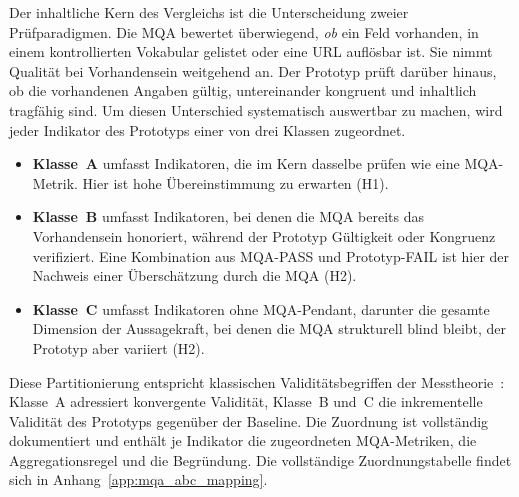 Der inhaltliche Kern des Vergleichs ist die Unterscheidung zweier Prüfparadigmen. Die MQA
bewertet überwiegend, \emph{ob} ein Feld vorhanden, in einem kontrollierten Vokabular
gelistet oder eine URL auflösbar ist. Sie nimmt Qualität bei Vorhandensein weitgehend an.
Der Prototyp prüft darüber hinaus, ob die vorhandenen Angaben gültig, untereinander
kongruent und inhaltlich tragfähig sind. Um diesen Unterschied systematisch auswertbar zu
machen, wird jeder Indikator des Prototyps einer von drei Klassen zugeordnet.

\begin{itemize}
    \item \textbf{Klasse~A} umfasst Indikatoren, die im Kern dasselbe prüfen wie eine
    MQA-Metrik. Hier ist hohe Übereinstimmung zu erwarten (H1).

    \item \textbf{Klasse~B} umfasst Indikatoren, bei denen die MQA bereits das Vorhandensein honoriert, während der Prototyp Gültigkeit oder Kongruenz verifiziert. Eine Kombination aus MQA-PASS und Prototyp-FAIL ist hier der Nachweis einer Überschätzung durch die MQA (H2).

    \item \textbf{Klasse~C} umfasst Indikatoren ohne MQA-Pendant, darunter die gesamte Dimension
    der Aussagekraft, bei denen die MQA strukturell blind bleibt, der Prototyp aber
    variiert (H2).
\end{itemize}

Diese Partitionierung entspricht klassischen Validitätsbegriffen der
Messtheorie~\cite{cronbach1955construct}: Klasse~A adressiert konvergente Validität,
Klasse~B und~C die inkrementelle Validität des Prototyps gegenüber der Baseline. Die
Zuordnung ist vollständig dokumentiert und enthält je Indikator die zugeordneten
MQA-Metriken, die Aggregationsregel und die Begründung. Die vollständige
Zuordnungstabelle findet sich in Anhang~\ref{app:mqa_abc_mapping}.

